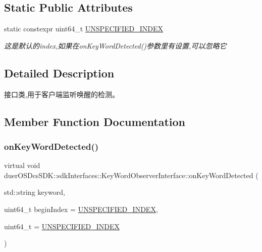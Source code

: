 \subsection*{Static Public Attributes}
\begin{DoxyCompactItemize}
\item 
static constexpr uint64\+\_\+t \hyperlink{classduerOSDcsSDK_1_1sdkInterfaces_1_1KeyWordObserverInterface_a11ee242b3d72866143211ed5526953c1}{U\+N\+S\+P\+E\+C\+I\+F\+I\+E\+D\+\_\+\+I\+N\+D\+EX}
\begin{DoxyCompactList}\small\item\em 这是默认的index,如果在on\+Key\+Word\+Detected()参数里有设置,可以忽略它 \end{DoxyCompactList}\end{DoxyCompactItemize}


\subsection{Detailed Description}
接口类,用于客户端监听唤醒的检测。 

\subsection{Member Function Documentation}
\mbox{\label{classduerOSDcsSDK_1_1sdkInterfaces_1_1KeyWordObserverInterface_af2a248b56dd4977e02cfdcfffa9047bf}} 
\subsubsection{\texorpdfstring{on\+Key\+Word\+Detected()}{onKeyWordDetected()}}
{\footnotesize\ttfamily virtual void duer\+O\+S\+Dcs\+S\+D\+K\+::sdk\+Interfaces\+::\+Key\+Word\+Observer\+Interface\+::on\+Key\+Word\+Detected (\begin{DoxyParamCaption}\item[{std\+::string}]{keyword,  }\item[{uint64\+\_\+t}]{begin\+Index = {\ttfamily \hyperlink{classduerOSDcsSDK_1_1sdkInterfaces_1_1KeyWordObserverInterface_a11ee242b3d72866143211ed5526953c1}{U\+N\+S\+P\+E\+C\+I\+F\+I\+E\+D\+\_\+\+I\+N\+D\+EX}},  }\item[{uint64\+\_\+t}]{ = {\ttfamily \hyperlink{classduerOSDcsSDK_1_1sdkInterfaces_1_1KeyWordObserverInterface_a11ee242b3d72866143211ed5526953c1}{U\+N\+S\+P\+E\+C\+I\+F\+I\+E\+D\+\_\+\+I\+N\+D\+EX}} }\end{DoxyParamCaption})\hspace{0.3cm}{\ttfamily [pure virtual]}}



